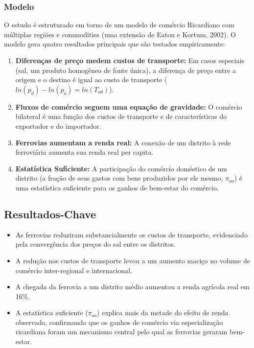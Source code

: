 \documentclass[12pt]{article}
\begin{document}
\subsubsection*{Modelo}
O estudo é estruturado em torno de um modelo de comércio Ricardiano com múltiplas regiões e commodities (uma extensão de Eaton e Kortum, 2002). O modelo gera quatro resultados principais que são testados empiricamente:
\begin{enumerate}
    \item \textbf{Diferenças de preço medem custos de transporte:} Em casos especiais (sal, um produto homogêneo de fonte única), a diferença de preço entre a origem e o destino é igual ao custo de transporte ($ln(p_d) - ln(p_o) = ln(T_{od})$).
    \item \textbf{Fluxos de comércio seguem uma equação de gravidade:} O comércio bilateral é uma função dos custos de transporte e de características do exportador e do importador.
    \item \textbf{Ferrovias aumentam a renda real:} A conexão de um distrito à rede ferroviária aumenta sua renda real per capita.
    \item \textbf{Estatística Suficiente:} A participação do comércio doméstico de um distrito (a fração de seus gastos com bens produzidos por ele mesmo, $\pi_{oo}$) é uma estatística suficiente para os ganhos de bem-estar do comércio.
\end{enumerate}

\subsection*{Resultados-Chave}
\begin{itemize}
    \item As ferrovias reduziram substancialmente os custos de transporte, evidenciado pela convergência dos preços do sal entre os distritos.
    \item A redução nos custos de transporte levou a um aumento maciço no volume de comércio inter-regional e internacional.
    \item A chegada da ferrovia a um distrito médio aumentou a renda agrícola real em 16\%.
    \item A estatística suficiente ($\pi_{oo}$) explica mais da metade do efeito de renda observado, confirmando que os ganhos de comércio via especialização ricardiana foram um mecanismo central pelo qual as ferrovias geraram bem-estar.
\end{itemize}
\end{document}
